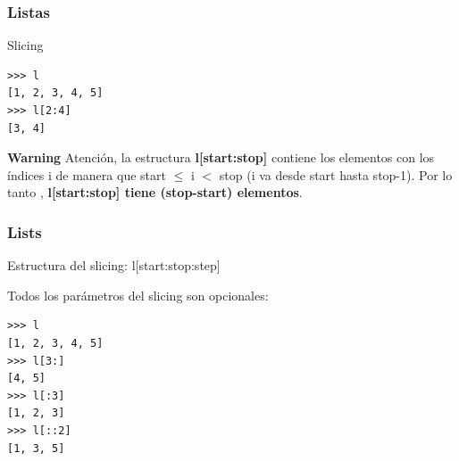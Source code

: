 \documentclass[10pt,colorlinks]{beamer}
\begin{document}
\begin{frame}[fragile]\frametitle{Listas}
\begin{block}{Slicing}
\begin{verbatim}
>>> l
[1, 2, 3, 4, 5]
>>> l[2:4]
[3, 4]
\end{verbatim}


\end{block}
\begin{block}{{\color{green}\textbf{Warning} }}
Atención, la estructura  \textbf{l[start:stop]} contiene los elementos con los índices i de manera que start $\le$ i $<$ stop (i va desde start hasta stop-1). Por lo tanto , \textbf{l[start:stop] tiene (stop-start) elementos}.
\end{block}

\end{frame}

\begin{frame}[fragile]\frametitle{Lists}
\begin{block}{}
Estructura del slicing: l[start:stop:step]
\end{block}
\begin{block}{Todos los parámetros del slicing son opcionales:}
\begin{verbatim}
>>> l
[1, 2, 3, 4, 5]
>>> l[3:]
[4, 5]
>>> l[:3]
[1, 2, 3]
>>> l[::2]
[1, 3, 5]
\end{verbatim}

\end{block}
\end{frame}
\end{document}
